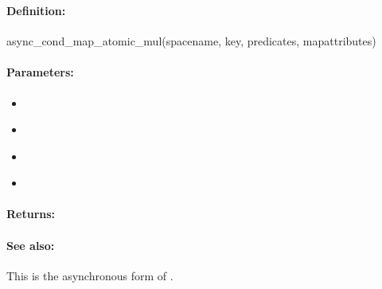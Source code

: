 \pagebreak
\subsubsection{}
\label{api:ruby:async_cond_map_atomic_mul}


\paragraph{Definition:}
\begin{rubycode}
async_cond_map_atomic_mul(spacename, key, predicates, mapattributes)
\end{rubycode}

\paragraph{Parameters:}
\begin{itemize}[noitemsep]
\item {}\\

\item {}\\

\item {}\\

\item {}\\

\end{itemize}

\paragraph{Returns:}


\paragraph{See also:}  This is the asynchronous form of .

\pagebreak
\subsubsection{}
\label{api:ruby:map_atomic_div}


